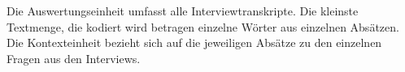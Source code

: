 Die Auswertungseinheit umfasst alle Interviewtranskripte. Die kleinste Textmenge, die kodiert wird betragen einzelne Wörter aus einzelnen Absätzen. Die Kontexteinheit bezieht sich auf die jeweiligen Absätze zu den einzelnen Fragen aus den Interviews.
%	
%	
